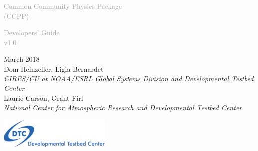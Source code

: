 \begin{titlepage}
\renewcommand{\thefootnote}{\fnsymbol{footnote}}

\vspace*{1em}
\noindent

\begin{center}
\textcolor{darkgray}{\bigsf Common Community Physics Package\\[0.5ex] (CCPP)}
\vspace*{1em}

\textcolor{darkgray}{\bigst Developers' Guide\\[0.5ex] v1.0}
\vspace*{1em}

\large{March 2018}\\[4em]

Dom Heinzeller, Ligia Bernardet\\
\textit{\small{CIRES/CU at NOAA/ESRL Global Systems Division and Developmental Testbed Center}}\\[4em]

Laurie Carson, Grant Firl\\
\textit{\small{National Center for Atmospheric Research and Developmental Testbed Center}}\\[4em]

\vspace{4em}

\includegraphics[width=0.4\textwidth]{images/dtc_logo.png}\\[2em]

\end{center}
\end{titlepage}
\pagebreak{}
